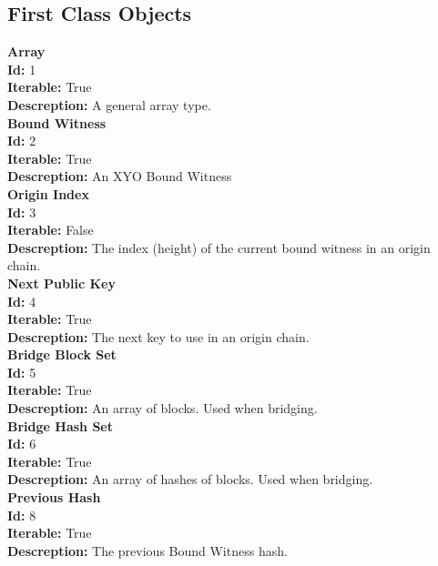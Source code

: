 \documentclass[11pt]{article}
\begin{document}
\subsection{First Class Objects}
\noindent
\textbf{Array} \\
\indent \textbf{Id:} 1 \\
\indent \textbf{Iterable:} True \\
\indent \textbf{Descreption:} A general array type. \\

\noindent
\textbf{Bound Witness} \\
\indent \textbf{Id:} 2 \\
\indent \textbf{Iterable:} True \\
\indent \textbf{Descreption:} An XYO Bound Witness \\

\noindent
\textbf{Origin Index} \\
\indent \textbf{Id:} 3 \\
\indent \textbf{Iterable:} False \\
\indent \textbf{Descreption:} The index (height) of the current bound witness in an origin chain. \\


\noindent
\textbf{Next Public Key} \\
\indent \textbf{Id:} 4 \\
\indent \textbf{Iterable:} True \\
\indent \textbf{Descreption:} The next key to use in an origin chain. \\

\noindent
\textbf{Bridge Block Set} \\
\indent \textbf{Id:} 5 \\
\indent \textbf{Iterable:} True \\
\indent \textbf{Descreption:} An array of blocks. Used when bridging. \\

\noindent
\textbf{Bridge Hash Set} \\
\indent \textbf{Id:} 6 \\
\indent \textbf{Iterable:} True \\
\indent \textbf{Descreption:} An array of hashes of blocks. Used when bridging. \\

\noindent
\textbf{Previous Hash} \\
\indent \textbf{Id:} 8 \\
\indent \textbf{Iterable:} True \\
\indent \textbf{Descreption:} The previous Bound Witness hash. \\
\end{document}
